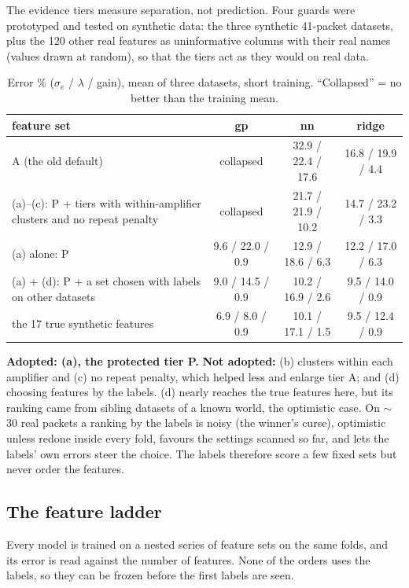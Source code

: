 \documentclass[10pt]{article}
\newcommand{\se}{\sigma_e}
\begin{document}
The evidence tiers measure separation, not prediction. Four guards were prototyped and tested on synthetic data: the
three synthetic 41-packet datasets, plus the 120 other real features as uninformative columns with their real names
(values drawn at random), so that the tiers act as they would on real data.

\begin{table}[H]
\centering\small
\begin{tabularx}{\textwidth}{Lccc}
\toprule
feature set & gp & nn & ridge \\
\midrule
A (the old default) & collapsed & 32.9 / 22.4 / 17.6 & 16.8 / 19.9 / 4.4 \\
(a)--(c): P + tiers with within-amplifier clusters and no repeat penalty & collapsed & 21.7 / 21.9 / 10.2 & 14.7 / 23.2 / 3.3 \\
(a) alone: P & 9.6 / 22.0 / 0.9 & 12.9 / 18.6 / 6.3 & 12.2 / 17.0 / 6.3 \\
(a) + (d): P + a set chosen with labels on other datasets & 9.0 / 14.5 / 0.9 & 10.2 / 16.9 / 2.6 & 9.5 / 14.0 / 0.9 \\
the 17 true synthetic features & 6.9 / 8.0 / 0.9 & 10.1 / 17.1 / 1.5 & 9.5 / 12.4 / 0.9 \\
\bottomrule
\end{tabularx}
\caption{Error \% ($\se$ / $\lambda$ / gain), mean of three datasets, short training. ``Collapsed'' = no better than the
training mean.}
\end{table}

\textbf{Adopted: (a), the protected tier P.} \textbf{Not adopted:} (b) clusters within each amplifier and (c) no repeat
penalty, which helped less and enlarge tier A; and (d) choosing features by the labels. (d) nearly reaches the true
features here, but its ranking came from sibling datasets of a known world, the optimistic case. On $\sim$30 real
packets a ranking by the labels is noisy (the winner's curse), optimistic unless redone inside every fold, favours the
settings scanned so far, and lets the labels' own errors steer the choice. The labels therefore score a few fixed sets
but never order the features.

\subsection{The feature ladder}
\label{sec:ladder}

Every model is trained on a nested series of feature sets on the same folds, and its error is read against the number
of features. None of the orders uses the labels, so they can be frozen before the first labels are seen.
\end{document}
